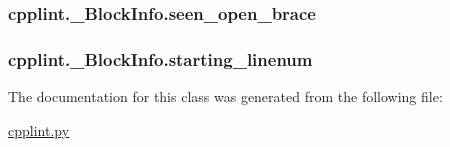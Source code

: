 \subsubsection[{\texorpdfstring{seen\+\_\+open\+\_\+brace}{seen_open_brace}}]{\setlength{\rightskip}{0pt plus 5cm}cpplint.\+\_\+\+Block\+Info.\+seen\+\_\+open\+\_\+brace}\hypertarget{classcpplint_1_1__BlockInfo_aa974539217437751383ad20896c974d7}{}\label{classcpplint_1_1__BlockInfo_aa974539217437751383ad20896c974d7}
\subsubsection[{\texorpdfstring{starting\+\_\+linenum}{starting_linenum}}]{\setlength{\rightskip}{0pt plus 5cm}cpplint.\+\_\+\+Block\+Info.\+starting\+\_\+linenum}\hypertarget{classcpplint_1_1__BlockInfo_a81d316f03e42aebbfe0636f905c4c291}{}\label{classcpplint_1_1__BlockInfo_a81d316f03e42aebbfe0636f905c4c291}


The documentation for this class was generated from the following file\+:\begin{DoxyCompactItemize}
\item 
\hyperlink{cpplint_8py}{cpplint.\+py}\end{DoxyCompactItemize}
